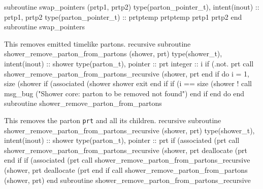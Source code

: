 \eatline
\nwendcode{}\nwdocspar
\nwenddocs{}\plusendmoddef
  subroutine swap_pointers (prtp1, prtp2)
    type(parton_pointer_t), intent(inout) :: prtp1, prtp2
    type(parton_pointer_t) :: prtptemp
    prtptemp%
    prtp1%
    prtp2%
  end subroutine swap_pointers

\eatline
\nwendcode{}This removes emitted timelike partons.
\nwenddocs{}\plusendmoddef
  recursive subroutine shower_remove_parton_from_partons (shower, prt)
    type(shower_t), intent(inout) :: shower
    type(parton_t), pointer :: prt
    integer :: i
    if (.not. prt%
       call shower_remove_parton_from_partons_recursive (shower, prt%
    end if
    do i = 1, size (shower%
       if (associated (shower%
          shower%
          exit
       end if
       if (i == size (shower%
          ! call msg_bug ("Shower core: parton to be removed not found")
       end if
    end do
  end subroutine shower_remove_parton_from_partons

\eatline
\nwendcode{}This removes the parton {\tt{}prt} and all its children.
\nwenddocs{}\plusendmoddef
  recursive subroutine shower_remove_parton_from_partons_recursive (shower, prt)
    type(shower_t), intent(inout) :: shower
    type(parton_t), pointer :: prt
    if (associated (prt%
       call shower_remove_parton_from_partons_recursive (shower, prt%
       deallocate (prt%
    end if
    if (associated (prt%
       call shower_remove_parton_from_partons_recursive (shower, prt%
       deallocate (prt%
    end if
    call shower_remove_parton_from_partons (shower, prt)
  end subroutine shower_remove_parton_from_partons_recursive


